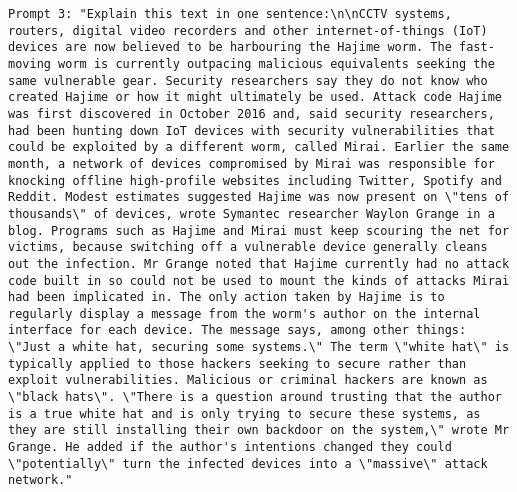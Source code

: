 \begin{lstlisting}[label=lst:judge_summar_instances,caption={Example of prompts for paraphrasing in English and French.}]
Prompt 3: "Explain this text in one sentence:\n\nCCTV systems, routers, digital video recorders and other internet-of-things (IoT) devices are now believed to be harbouring the Hajime worm. The fast-moving worm is currently outpacing malicious equivalents seeking the same vulnerable gear. Security researchers say they do not know who created Hajime or how it might ultimately be used. Attack code Hajime was first discovered in October 2016 and, said security researchers, had been hunting down IoT devices with security vulnerabilities that could be exploited by a different worm, called Mirai. Earlier the same month, a network of devices compromised by Mirai was responsible for knocking offline high-profile websites including Twitter, Spotify and Reddit. Modest estimates suggested Hajime was now present on \"tens of thousands\" of devices, wrote Symantec researcher Waylon Grange in a blog. Programs such as Hajime and Mirai must keep scouring the net for victims, because switching off a vulnerable device generally cleans out the infection. Mr Grange noted that Hajime currently had no attack code built in so could not be used to mount the kinds of attacks Mirai had been implicated in. The only action taken by Hajime is to regularly display a message from the worm's author on the internal interface for each device. The message says, among other things: \"Just a white hat, securing some systems.\" The term \"white hat\" is typically applied to those hackers seeking to secure rather than exploit vulnerabilities. Malicious or criminal hackers are known as \"black hats\". \"There is a question around trusting that the author is a true white hat and is only trying to secure these systems, as they are still installing their own backdoor on the system,\" wrote Mr Grange. He added if the author's intentions changed they could \"potentially\" turn the infected devices into a \"massive\" attack network."


\end{lstlisting}
